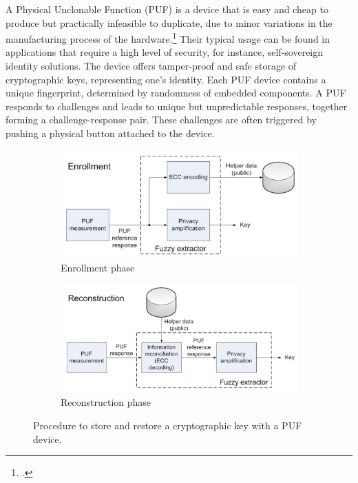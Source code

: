 \documentclass[USenglish]{article}
\begin{document}
A Physical Unclonable Function (PUF) is a device that is easy and cheap to produce but practically infeasible to duplicate, due to minor variations in the manufacturing process of the hardware.\footcite{cortez2012modeling}
Their typical usage can be found in applications that require a high level of security, for instance, self-sovereign identity solutions.
The device offers tamper-proof and safe storage of cryptographic keys, representing one's identity.
Each PUF device contains a unique fingerprint, determined by randomness of embedded components.
A PUF responds to challenges and leads to unique but unpredictable responses, together forming a challenge-response pair.
These challenges are often triggered by pushing a physical button attached to the device.

\begin{figure}
	\centering
	\begin{subfigure}{.5\textwidth}
		\centering
		\includegraphics[width=.9\linewidth]{assets/puf_enrollment}
		\caption{Enrollment phase}
		\label{fig:puf_enrollment}
	\end{subfigure}%
	\begin{subfigure}{.5\textwidth}
		\centering
		\includegraphics[width=.9\linewidth]{assets/puf_reconstruction}
		\caption{Reconstruction phase}
		\label{fig:puf_reconstruction}
	\end{subfigure}
	\caption{Procedure to store and restore a cryptographic key with a PUF device.}
	\label{fig:puf_key_storage}
\end{figure}
\end{document}
